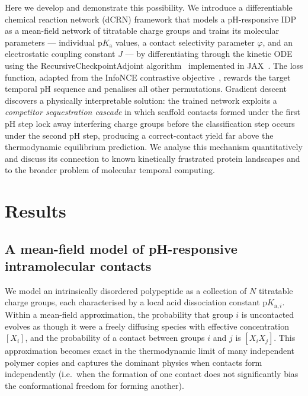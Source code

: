 \documentclass[10pt,twocolumn]{article}
\begin{document}
Here we develop and demonstrate this possibility.
We introduce a differentiable chemical reaction network (dCRN) framework that models a pH-responsive IDP as a mean-field network of titratable charge groups and trains its molecular parameters — individual $\mathrm{p}K_\mathrm{a}$ values, a contact selectivity parameter $\varphi$, and an electrostatic coupling constant $J$ — by differentiating through the kinetic ODE using the RecursiveCheckpointAdjoint algorithm~\cite{kidger2022} implemented in JAX~\cite{jax2018}.
The loss function, adapted from the InfoNCE contrastive objective~\cite{oord2018}, rewards the target temporal pH sequence and penalises all other permutations.
Gradient descent discovers a physically interpretable solution: the trained network exploits a \emph{competitor sequestration cascade} in which scaffold contacts formed under the first pH step lock away interfering charge groups before the classification step occurs under the second pH step, producing a correct-contact yield far above the thermodynamic equilibrium prediction.
We analyse this mechanism quantitatively and discuss its connection to known kinetically frustrated protein landscapes and to the broader problem of molecular temporal computing.

\section{Results}

\subsection{A mean-field model of pH-responsive intramolecular contacts}

We model an intrinsically disordered polypeptide as a collection of $N$ titratable charge groups, each characterised by a local acid dissociation constant $\mathrm{p}K_{\mathrm{a},i}$.
Within a mean-field approximation, the probability that group $i$ is uncontacted evolves as though it were a freely diffusing species with effective concentration $[X_i]$, and the probability of a contact between groups $i$ and $j$ is $[X_i X_j]$.
This approximation becomes exact in the thermodynamic limit of many independent polymer copies and captures the dominant physics when contacts form independently (i.e.\ when the formation of one contact does not significantly bias the conformational freedom for forming another).
\end{document}
